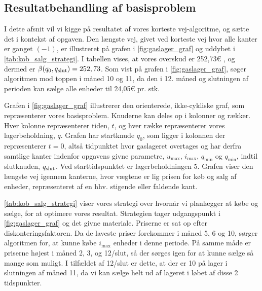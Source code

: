 \subsection{Resultatbehandling af basisproblem}

I dette afsnit vil vi kigge på resultatet af vores korteste vej-algoritme, og sætte det i kontekst af opgaven. Den længste vej, givet ved korteste vej hvor alle kanter er ganget $(-1)$, er illustreret på grafen i \autoref{fig:gaslager_graf} og uddybet i \autoref{tab:kob_salg_strategi}. I tabellen vises, at vores overskud er 252,73€ %
, og dermed er $\beta (q_0, q_{\textrm{slut}}) = 252,73$. Som vist på grafen i \autoref{fig:gaslager_graf}, søger algoritmen mod toppen i måned 10 og 11, da den i 12. måned og slutningen af perioden kan sælge alle enheder til 24,05€ pr. stk. 



Grafen i \autoref{fig:gaslager_graf} illustrerer den orienterede, ikke-cykliske graf, som repræsenterer vores basisproblem. Knuderne kan deles op i kolonner og rækker. Hver kolonne repræsenterer tiden, $t$, og hver række repræsenterer vores lagerbeholdning, $q$. Grafen har startknude $q_0$, som ligger i kolonnen der repræsenterer $t=0$, altså tidpunktet hvor gaslageret overtages og har derfra samtlige kanter indenfor opgavens givne parametre, $u_{\max }$, $i_{\max }$, $q_{\min }$ og $q_{\min }$, indtil slutknuden, $q_{\textrm{slut}}$. Ved starttidspunktet er lagerbeholdningen 5. Grafen viser den længste vej igennem kanterne, hvor vægtene er lig prisen for køb og salg af enheder, repræsenteret af en hhv. stigende eller faldende kant.



\autoref{tab:kob_salg_strategi} viser vores strategi over hvornår vi planlægger at købe og sælge, for at optimere vores resultat. Strategien tager udgangspunkt i \autoref{fig:gaslager_graf} og det givne materiale. Priserne er sat op efter diskonteringsfaktoren.%
 Da de laveste priser forekommer i måned 5, 6 og 10, sørger algoritmen for, at kunne købe $i_{\max}$ enheder i denne periode. På samme måde er priserne højest i måned 2, 3, og 12/slut, så der sørges igen for at kunne sælge så mange som muligt. I tilfældet af 12/slut er dette, at der er 10 på lager i slutningen af måned 11, da vi kan sælge helt ud af lageret i løbet af disse 2 tidspunkter.

